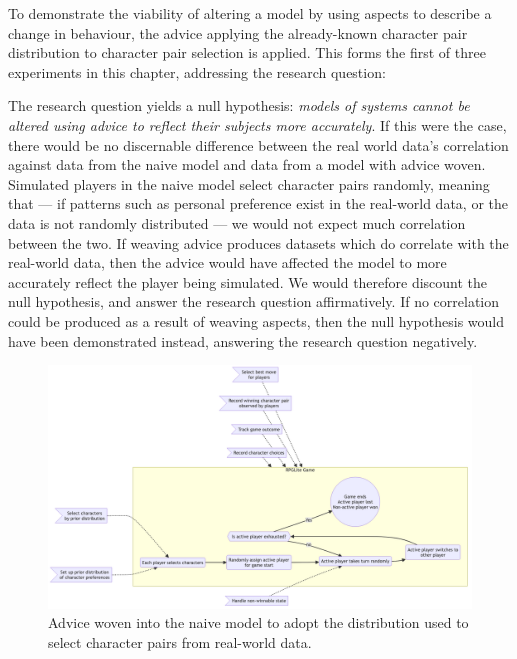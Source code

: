 To demonstrate the viability of altering a model by using aspects to describe a
change in behaviour, the advice applying the already-known character pair
distribution to character pair selection is applied. This forms the first of
three experiments in this chapter, addressing the research question:

\begin{researchquestion}
\rqtwo{}
\end{researchquestion}

The research question yields a null hypothesis: \emph{models of systems cannot
be altered using advice to reflect their subjects more accurately}. If this were
the case, there would be no discernable difference between the real world data's
correlation against data from the naive model and data from a model with advice
woven. Simulated players in the naive model select character pairs randomly,
meaning that --- if patterns such as personal preference exist in the real-world
data, or the data is not randomly distributed --- we would not expect much
correlation between the two. If weaving advice produces datasets which do
correlate with the real-world data, then the advice would have affected the
model to more accurately reflect the player being simulated. We would therefore
discount the null hypothesis, and answer the research question affirmatively. If
no correlation could be produced as a result of weaving aspects, then the null
hypothesis would have been demonstrated instead, answering the research question
negatively.

\begin{figure}[h]
  \centering
  \includegraphics[width=\columnwidth]{70_generality_of_aspects/diagrams/exp2_prior_distribution_model.png}
  \caption{Advice woven into the naive model to adopt the distribution used to select character pairs from real-world data.}
  \label{fig:exp1_prior_distribution_model}
\end{figure}

